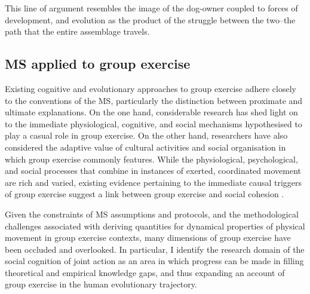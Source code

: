 This line of argument resembles the image of the dog-owner coupled to forces of development, and evolution as the product of the struggle between the two--the path that the entire assemblage travels.


\subsection{MS applied to group exercise}
Existing cognitive and evolutionary approaches to group exercise adhere closely to the conventions of the MS, particularly the distinction between proximate and ultimate explanations.  On the one hand, considerable research has shed light on to the immediate physiological, cognitive, and social mechanisms hypothesised to play a casual role in group exercise.  On the other hand, researchers have also considered the adaptive value of cultural activities and social organisation in which group exercise commonly features.  While the physiological, psychological, and social processes that combine in instances of exerted, coordinated movement are rich and varied, existing evidence pertaining to the immediate causal triggers of group exercise suggest a link between group exercise and social cohesion \citep{Davis2015,Cohen2017}.

Given the constraints of MS assumptions and protocols, and the methodological challenges associated with deriving quantities for dynamical properties of physical movement in group exercise contexts, many dimensions of group exercise have been occluded and overlooked.  In particular, I identify the research domain of the social cognition of joint action as an area in which progress can be made in filling theoretical and empirical knowledge gaps, and thus expanding an account of group exercise in the human evolutionary trajectory.


